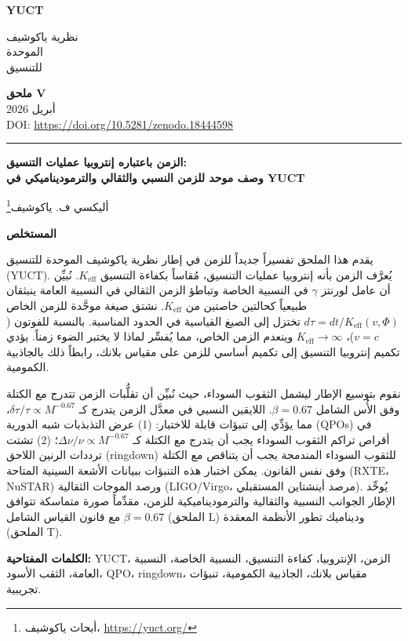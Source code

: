 \documentclass[11pt,a4paper]{article}
\newcommand{\Ke}{K_{\mathrm{eff}}}
\newcommand{\makeheader}{%
	\noindent
	\begin{minipage}{0.17\textwidth}
		\raggedright
		{\sffamily\bfseries\color{skyblue}\fontsize{46}{46}\selectfont YUCT}%
	\end{minipage}%
	\hspace{30pt}
	\begin{minipage}{0.32\textwidth}
		\raggedright
		{\sffamily\fontsize{11}{13}\selectfont نظرية ياكوشيف\\ الموحدة\\ للتنسيق}%
	\end{minipage}%
	\hfill
	\begin{minipage}{0.38\textwidth}
		\raggedleft
		{\sffamily\bfseries ملحق V}\\
		{\sffamily أبريل 2026}\\
		{\sffamily\footnotesize DOI: \url{https://doi.org/10.5281/zenodo.18444598}}%
	\end{minipage}
	\par\vspace{5pt}
	\noindent\textcolor{gold}{\rule{\textwidth}{1.6pt}}
	\par\vspace{0pt}
}
\begin{document}
	\thispagestyle{firstpage}
	\makeheader
	
	\vspace{0cm}
	
		{\LARGE\bfseries الزمن باعتباره إنتروبيا عمليات التنسيق: \\
			وصف موحد للزمن النسبي والثقالي والترموديناميكي في YUCT \par}
	
	\vspace{0.2cm}
	
	{\large أليكسي ف. ياكوشيف\footnote{أبحاث ياكوشيف، \url{https://yuct.org/}}} \\
	\vspace{0.0cm}
	
	{\color{darkblue}\textbf{\LARGE المستخلص}} \par
	{\large
		\noindent
		يقدم هذا الملحق تفسيراً جديداً للزمن في إطار نظرية ياكوشيف الموحدة للتنسيق (YUCT). يُعرَّف الزمن بأنه إنتروبيا عمليات التنسيق، مُقاساً بكفاءة التنسيق \(\Ke\). نُبيِّن أن عامل لورنتز \(\gamma\) في النسبية الخاصة وتباطؤ الزمن الثقالي في النسبية العامة ينبثقان طبيعياً كحالتين خاصتين من \(\Ke\). نشتق صيغة موحَّدة للزمن الخاص \(d\tau = dt/\Ke(v,\Phi)\) تختزل إلى الصيغ القياسية في الحدود المناسبة. بالنسبة للفوتون (\(v=c\))، \(\Ke \to \infty\) وينعدم الزمن الخاص، مما يُفسِّر لماذا لا يختبر الضوء زمناً. يؤدي تكميم إنتروبيا التنسيق إلى تكميم أساسي للزمن على مقياس بلانك، رابطاً ذلك بالجاذبية الكمومية. 
		
		نقوم بتوسيع الإطار ليشمل الثقوب السوداء، حيث نُبيِّن أن تقلُّبات الزمن تتدرج مع الكتلة وفق الأُس الشامل \(\beta = 0.67\). اللايقين النسبي في معدَّل الزمن يتدرج كـ \(\delta\tau/\tau \propto M^{-0.67}\)، مما يؤدِّي إلى تنبؤات قابلة للاختبار: (1) عرض التذبذبات شبه الدورية (QPOs) في أقراص تراكم الثقوب السوداء يجب أن يتدرج مع الكتلة كـ \(\Delta\nu/\nu \propto M^{-0.67}\)؛ (2) تشتت ترددات الرنين اللاحق (ringdown) للثقوب السوداء المندمجة يجب أن يتناقص مع الكتلة وفق نفس القانون. يمكن اختبار هذه التنبؤات ببيانات الأشعة السينية المتاحة (RXTE، NuSTAR) ورصد الموجات الثقالية (LIGO/Virgo، مرصد أينشتاين المستقبلي). يُوحِّد الإطار الجوانب النسبية والثقالية والترموديناميكية للزمن، مقدِّماً صورة متماسكة تتوافق مع قانون القياس الشامل \(\beta = 0.67\) (الملحق L) وديناميك تطور الأنظمة المعقدة (الملحق T).
	}
	
	\vspace{0.1cm}
	\noindent
	{\color{darkblue}\textbf{الكلمات المفتاحية:}} YUCT، الزمن، الإنتروبيا، كفاءة التنسيق، النسبية الخاصة، النسبية العامة، الثقب الأسود، QPO، ringdown، مقياس بلانك، الجاذبية الكمومية، تنبؤات تجريبية.
	
\end{document}
